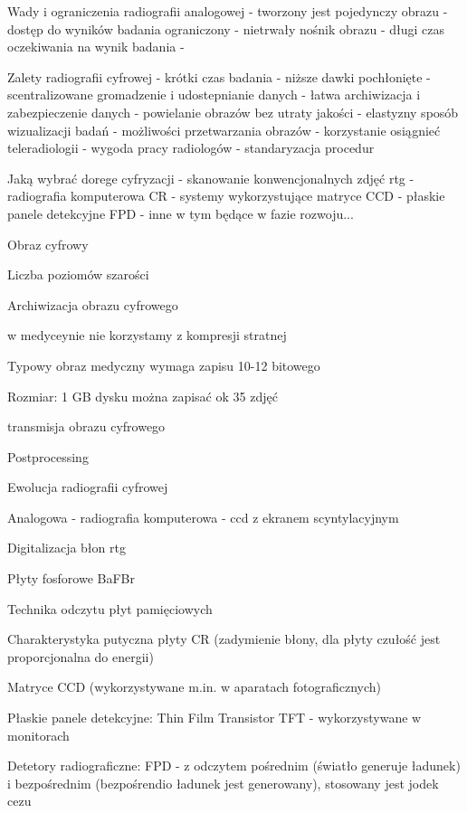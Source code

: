 \documentclass{article}
\begin{document}
Wady i ograniczenia radiografii analogowej
- tworzony jest pojedynczy obrazu
- dostęp do wyników badania ograniczony
- nietrwały nośnik obrazu
- długi czas oczekiwania na wynik badania
- 

Zalety radiografii cyfrowej
- krótki czas badania
- niższe dawki pochłonięte
- scentralizowane gromadzenie i udostepnianie danych
- łatwa archiwizacja i zabezpieczenie danych - powielanie obrazów bez utraty jakości
- elastyzny sposób wizualizacji badań
- możliwości przetwarzania obrazów
- korzystanie  osiągnieć teleradiologii
- wygoda pracy radiologów
- standaryzacja procedur

Jaką wybrać dorege cyfryzacji
- skanowanie konwencjonalnych zdjęć rtg
- radiografia komputerowa CR
- systemy wykorzystujące matryce CCD
- płaskie panele detekcyjne FPD
- inne w tym będące w fazie rozwoju...

Obraz cyfrowy

Liczba poziomów szarości

Archiwizacja obrazu cyfrowego

w medyceynie nie korzystamy z kompresji stratnej

Typowy obraz medyczny wymaga zapisu 10-12 bitowego

Rozmiar: 1 GB dysku można zapisać ok 35 zdjęć

transmisja obrazu cyfrowego

Postprocessing

Ewolucja radiografii cyfrowej

Analogowa - radiografia komputerowa - ccd z ekranem scyntylacyjnym

Digitalizacja błon rtg

Płyty fosforowe BaFBr

Technika odczytu płyt pamięciowych

Charakterystyka putyczna płyty CR (zadymienie błony, dla płyty czułość jest proporcjonalna do energii)

Matryce CCD (wykorzystywane m.in. w aparatach fotograficznych)

Płaskie panele detekcyjne: Thin Film Transistor TFT - wykorzystywane w monitorach

Detetory radiograficzne: FPD - z odczytem pośrednim (światło generuje ładunek) i bezpośrednim (bezpośrendio ładunek jest generowany), stosowany jest jodek cezu
\end{document}

